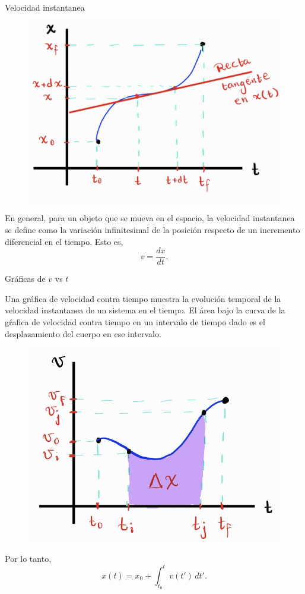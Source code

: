 \begin{frame}{Velocidad instantanea}

    \begin{figure}
        \centering
        \includegraphics[width=0.5\linewidth]{figures/XvsT2.jpg}
    \end{figure}
    
    En general, para un objeto que se mueva en el espacio, la velocidad instantanea se define como la variación infinitesimal de la posición respecto de un incremento diferencial en el tiempo. Esto es,
    \begin{equation}
        v=\frac{dx}{dt}.
    \end{equation}
\end{frame}

\begin{frame}{Gráficas de $v$ vs $t$}

Una gráfica de velocidad contra tiempo muestra la evolución temporal de la velocidad instantanea de un sistema en el tiempo. El área bajo la curva de la gŕafica de velocidad contra tiempo en un intervalo de tiempo dado es el desplazamiento del cuerpo en ese intervalo.

\begin{figure}
    \centering
    \includegraphics[width=0.4\linewidth]{figures/VvsT1.jpg}
\end{figure}

Por lo tanto, \begin{equation}
    x(t) = x_0 + \int_{t_0}^tv(t')\,dt'.
\end{equation}
    
\end{frame}


